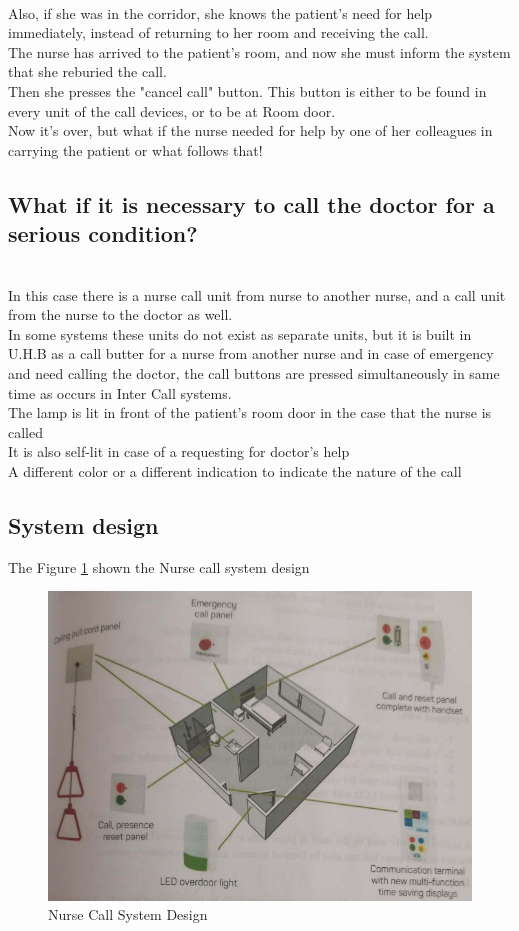\documentclass[12pt,fleqn]{book} %
\begin{document}
\\ Also, if she was in the corridor, she knows the patient's need for help immediately, instead of returning to her room and receiving the call. 
\\ The nurse has arrived to the patient's room, and now she must inform the system that she reburied the call.
\\ Then she presses the "cancel call" button. This button is either to be found in every unit of the call devices, or to be at Room door.
\\ Now it's over, but what if the nurse needed for help by one of her colleagues in carrying the patient or what follows that!
\subsection{What if it is necessary to call the doctor for a serious condition?}
\\ In this case there is a nurse call unit from nurse to another nurse, and a call unit from the nurse to the doctor as well.
\\ In some systems these units do not exist as separate units, but it is built in U.H.B as a call butter for a nurse from another nurse and in case of emergency and need calling the doctor, the call buttons are pressed simultaneously in same time as occurs in Inter Call systems.
\\ The lamp is lit in front of the patient's room door in the case that the nurse is called
\\ It is also self-lit in case of a requesting for doctor's help
\\ A different color or a different indication to indicate the nature of the call
\subsection{System design}
The Figure \ref{fig:hamdy 64} shown the Nurse call system design
\begin{figure}[!h]
    \centering
    \includegraphics[width=1\linewidth]{hamdy 64.png}
    \caption{Nurse Call System Design}
    \label{fig:hamdy 64}
    \end{figure}
\end{document}
